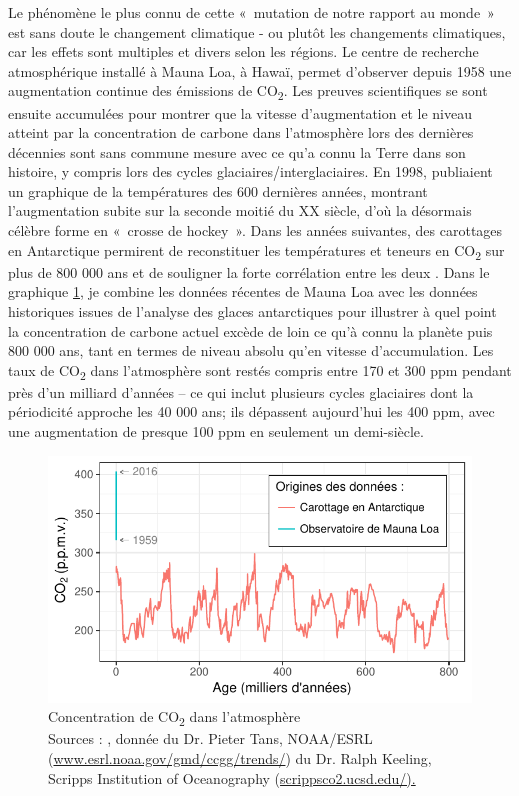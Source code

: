 Le phénomène le plus connu de cette «~mutation de notre rapport au monde~» \citep{Latour2015} est sans doute le changement climatique  - ou plutôt les changements climatiques, car les effets sont multiples et divers selon les régions.
Le centre de recherche atmosphérique installé à Mauna Loa, à Hawaï, permet d'observer depuis 1958 une augmentation continue des émissions de CO\textsubscript{2}. Les preuves scientifiques se sont ensuite accumulées pour montrer que la vitesse d'augmentation et le niveau atteint par la concentration de carbone dans l'atmosphère lors des dernières décennies sont sans commune mesure avec ce qu'a connu la Terre dans son histoire, y compris lors des cycles glaciaires/interglaciaires. En 1998, \citet{Mann1998} publiaient un graphique de la températures des 600 dernières années, montrant l'augmentation subite sur la seconde moitié du XX siècle, d'où la désormais célèbre forme en «~crosse de hockey~». 
Dans les années suivantes, des carottages en Antarctique permirent de reconstituer les températures et teneurs en CO\textsubscript{2} sur plus de 800 000 ans et de souligner la forte corrélation entre les deux \citep{Petit1999,Luthi2008}.
Dans le graphique \ref{fig:CO2Emissions}, je combine les données récentes de Mauna Loa avec les données historiques issues de l'analyse des glaces antarctiques pour illustrer à quel point la concentration de carbone actuel excède de loin ce qu'à connu la planète puis 800 000 ans, tant en termes de niveau absolu qu'en vitesse d'accumulation. Les taux de CO\textsubscript{2} dans l'atmosphère sont restés compris entre 170 et 300 ppm pendant près d'un milliard d'années -- ce qui inclut plusieurs cycles glaciaires dont la périodicité approche les 40 000 ans; ils dépassent aujourd'hui les 400 ppm, avec une augmentation de presque 100 ppm en seulement un demi-siècle.

\begin{figure}[!ht]
	\centering
	\includegraphics{figures/CO2Emissions.pdf}
	\caption[Concentration de CO\textsubscript{2} dans l'atmosphère]{Concentration de CO\textsubscript{2} dans l'atmosphère \\ Sources : \citet{Luthi2008}, donnée du Dr. Pieter Tans, NOAA/ESRL (\url{www.esrl.noaa.gov/gmd/ccgg/trends/}) du Dr. Ralph Keeling, Scripps Institution of Oceanography (\url{scrippsco2.ucsd.edu/).}}
	\label{fig:CO2Emissions}
\end{figure}

